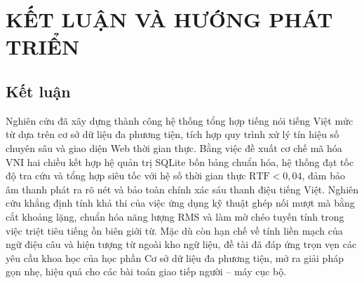 \section{KẾT LUẬN VÀ HƯỚNG PHÁT TRIỂN}

\subsection{Kết luận}
Nghiên cứu đã xây dựng thành công hệ thống tổng hợp tiếng nói tiếng Việt mức từ dựa trên cơ sở dữ liệu đa phương tiện, tích hợp quy trình xử lý tín hiệu số chuyên sâu và giao diện Web thời gian thực. Bằng việc đề xuất cơ chế mã hóa VNI hai chiều kết hợp hệ quản trị SQLite bốn bảng chuẩn hóa, hệ thống đạt tốc độ tra cứu và tổng hợp siêu tốc với hệ số thời gian thực $\text{RTF} < 0{,}04$, đảm bảo âm thanh phát ra rõ nét và bảo toàn chính xác sáu thanh điệu tiếng Việt. Nghiên cứu khẳng định tính khả thi của việc ứng dụng kỹ thuật ghép nối mượt mà bằng cắt khoảng lặng, chuẩn hóa năng lượng RMS và làm mờ chéo tuyến tính trong việc triệt tiêu tiếng ồn biên giới từ. Mặc dù còn hạn chế về tính liền mạch của ngữ điệu câu và hiện tượng từ ngoài kho ngữ liệu, đề tài đã đáp ứng trọn vẹn các yêu cầu khoa học của học phần Cơ sở dữ liệu đa phương tiện, mở ra giải pháp gọn nhẹ, hiệu quả cho các bài toán giao tiếp người -- máy cục bộ.

